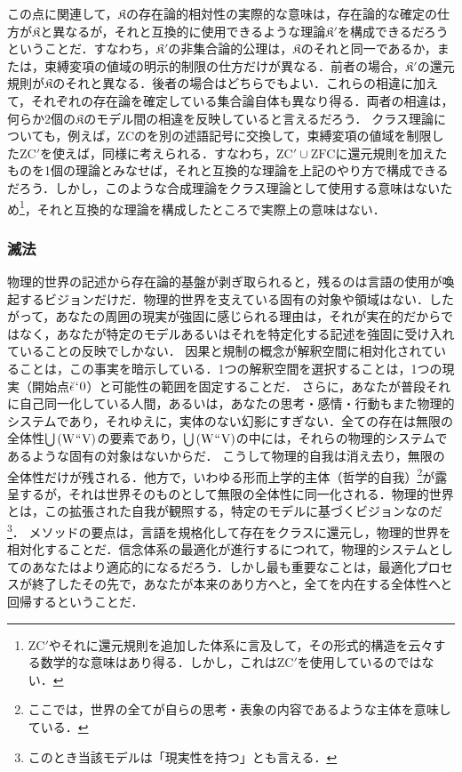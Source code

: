 この点に関連して，$\mathfrak{K}$の存在論的相対性の実際的な意味は，存在論的な確定の仕方が$\mathfrak{K}$と異なるが，それと互換的に使用できるような理論$\mathfrak{K}'$を構成できるだろうということだ．すなわち，$\mathfrak{K}'$の非集合論的公理は，$\mathfrak{K}$のそれと同一であるか，または，束縛変項の値域の明示的制限の仕方だけが異なる．前者の場合，$\mathfrak{K}'$の還元規則が$\mathfrak{K}$のそれと異なる．後者の場合はどちらでもよい．これらの相違に加えて，それぞれの存在論を確定している集合論自体も異なり得る．両者の相違は，何らか2個の$\mathfrak{K}$のモデル間の相違を反映していると言えるだろう．
クラス理論についても，例えば，$\mathrm{ZC}$の\kagi{$ \in $}を別の述語記号に交換して，束縛変項の値域を制限した$\mathrm{ZC}'$を使えば，同様に考えられる．すなわち，$\mathrm{ZC}'\cup\mathrm{ZFC}$に還元規則を加えたものを1個の理論とみなせば，それと互換的な理論を上記のやり方で構成できるだろう．しかし，このような合成理論をクラス理論として使用する意味はないため\footnote{
    $\mathrm{ZC}'$やそれに還元規則を追加した体系に言及して，その形式的構造を云々する数学的な意味はあり得る．しかし，これは$\mathrm{ZC}'$を使用しているのではない．
}，それと互換的な理論を構成したところで実際上の意味はない．

\subsubsection{滅法}
\label{sssec:滅法}

物理的世界の記述から存在論的基盤が剥ぎ取られると，残るのは言語の使用が喚起するビジョンだけだ．物理的世界を支えている固有の対象や領域はない．したがって，あなたの周囲の現実が強固に感じられる理由は，それが実在的だからではなく，あなたが特定のモデルあるいはそれを特定化する記述を強固に受け入れていることの反映でしかない．
因果と規制の概念が解釈空間に相対化されていることは，この事実を暗示している．1つの解釈空間を選択することは，1つの現実（開始点$ \breve{\epsilon}{\mspace{1mu}{`}\mspace{1mu}} 0 $）と可能性の範囲を固定することだ．
さらに，あなたが普段それに自己同一化している人間，あるいは，あなたの思考・感情・行動もまた物理的システムであり，それゆえに，実体のない幻影にすぎない．全ての存在は無限の全体性${\textstyle\bigcup}\mspace{3mu}(\mathrm{W}{\mspace{1mu}{``}\mspace{1mu}}\mathrm{V})$の要素であり，${\textstyle\bigcup}\mspace{3mu}(\mathrm{W}{\mspace{1mu}{``}\mspace{1mu}}\mathrm{V})$の中には，それらの物理的システムであるような固有の対象はないからだ．
こうして物理的自我は消え去り，無限の全体性だけが残される．他方で，いわゆる形而上学的主体（哲学的自我）\footnote{ここでは，世界の全てが自らの思考・表象の内容であるような主体を意味している．}が露呈するが，それは世界そのものとして無限の全体性に同一化される．物理的世界とは，この拡張された自我が観照する，特定のモデルに基づくビジョンなのだ\footnote{このとき当該モデルは「現実性を持つ」とも言える．}．
メソッドの要点は，言語を規格化して存在をクラスに還元し，物理的世界を相対化することだ．信念体系の最適化が進行するにつれて，物理的システムとしてのあなたはより適応的になるだろう．しかし最も重要なことは，最適化プロセスが終了したその先で，あなたが本来のあり方へと，全てを内在する全体性へと回帰するということだ．


